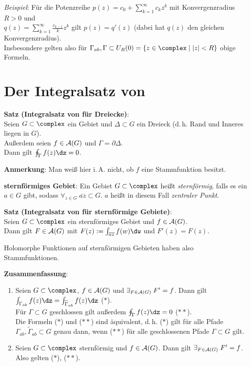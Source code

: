 \emph{Beispiel}:
Für die Potenzreihe $p(z) = c_0 + \sum_{k=1}^\infty c_k z^k$ mit
Konvergenzradius $R > 0$ und\\
$q(z) = \sum_{k=1}^\infty \frac{c_{k-1}}{k} z^k$ gilt $p(z) = q'(z)$
(dabei hat $q(z)$ den gleichen Konvergenzradius).\\
Insbesondere gelten also für
$\Gamma_{ab}, \Gamma \subset U_R(0) = \{z \in \complex \;|\; |z| < R\}$
obige Formeln.

\section{%
    Der Integralsatz von %
}

\textbf{Satz (Integralsatz von  für Dreiecke)}:\\
Seien $G \subset \complex$ ein Gebiet und $\Delta \subset G$ ein Dreieck
(d.\,h. Rand und Inneres liegen in $G$).\\
Außerdem seien $f \in \mathcal{A}(G)$ und $\Gamma = \partial \Delta$.\\
Dann gilt $\oint_\Gamma f(z)\dz = 0$.

\textbf{Anmerkung}:
Man weiß hier i.\,A. nicht, ob $f$ eine Stammfunktion besitzt.

\linie

\textbf{sternförmiges Gebiet}:
Ein Gebiet $G \subset \complex$ heißt \emph{sternförmig}, falls es ein
$a \in G$ gibt, sodass
$\forall_{z \in G}\; \overline{az} \subset G$.
$a$ heißt in diesem Fall \emph{zentraler Punkt}.

\textbf{Satz (Integralsatz von  für sternförmige Gebiete)}:\\
Seien $G \subset \complex$ ein sternförmiges Gebiet und $f \in \mathcal{A}(G)$.\\
Dann gilt $F \in \mathcal{A}(G)$ mit $F(z) := \int_{\overline{az}} f(w)\dw$ und
$F'(z) = F(z)$.

Holomorphe Funktionen auf sternförmigen Gebieten haben also Stammfunktionen.

\linie

\textbf{Zusammenfassung}:
\begin{enumerate}
    \item
    Seien $G \subset \complex$, $f \in \mathcal{A}(G)$ und
    $\exists_{F \in \mathcal{A}(G)}\; F' = f$.
    Dann gilt $\int_{\Gamma_{ab}} f(z)\dz =
    \int_{\widetilde{\Gamma}_{ab}} f(z)\dz$ ($\ast$).\\
    Für $\Gamma \subset G$ geschlossen gilt außerdem $\oint_\Gamma f(z)\dz = 0$
    ($\ast\ast$).\\
    Die Formeln ($\ast$) und ($\ast\ast$) sind äquivalent, d.\,h.
    ($\ast$) gilt für alle Pfade
    $\Gamma_{ab}, \widetilde{\Gamma}_{ab} \subset G$
    genau dann, wenn ($\ast\ast$) für alle geschlossenen Pfade
    $\Gamma \subset G$ gilt.

    \item
    Seien $G \subset \complex$ sternförmig und $f \in \mathcal{A}(G)$.
    Dann gilt $\exists_{F \in \mathcal{A}(G)}\; F' = f$.
    Also gelten ($\ast$), ($\ast\ast$).
\end{enumerate}

